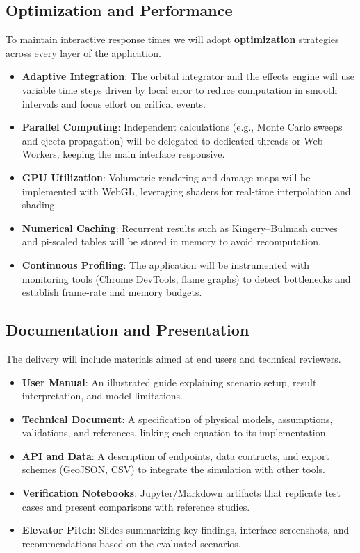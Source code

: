 \documentclass[conference]{IEEEtran}
\begin{document}
\subsection{Optimization and Performance}
To maintain interactive response times we will adopt \textbf{optimization}
strategies across every layer of the application.
\begin{itemize}
	\item \textbf{Adaptive Integration}: The orbital integrator and the effects
	      engine will use variable time steps driven by local error to reduce
	      computation in smooth intervals and focus effort on critical events.
	\item \textbf{Parallel Computing}: Independent calculations (e.g., Monte Carlo
	      sweeps and ejecta propagation) will be delegated to dedicated threads or
	      Web Workers, keeping the main interface responsive.
	\item \textbf{GPU Utilization}: Volumetric rendering and damage maps will be
	      implemented with WebGL, leveraging shaders for real-time interpolation and
	      shading.
	\item \textbf{Numerical Caching}: Recurrent results such as Kingery--Bulmash
	      curves and pi-scaled tables will be stored in memory to avoid
	      recomputation.
	\item \textbf{Continuous Profiling}: The application will be instrumented with
	      monitoring tools (Chrome DevTools, flame graphs) to detect bottlenecks and
	      establish frame-rate and memory budgets.
\end{itemize}

\subsection{Documentation and Presentation}
The delivery will include materials aimed at end users and technical reviewers.
\begin{itemize}
	\item \textbf{User Manual}: An illustrated guide explaining scenario setup,
	      result interpretation, and model limitations.
	\item \textbf{Technical Document}: A specification of physical models,
	      assumptions, validations, and references, linking each equation to its
	      implementation.
	\item \textbf{API and Data}: A description of endpoints, data contracts, and
	      export schemes (GeoJSON, CSV) to integrate the simulation with other
	      tools.
	\item \textbf{Verification Notebooks}: Jupyter/Markdown artifacts that
	      replicate test cases and present comparisons with reference studies.
	\item \textbf{Elevator Pitch}: Slides summarizing key findings, interface
	      screenshots, and recommendations based on the evaluated scenarios.
\end{itemize}
\end{document}

